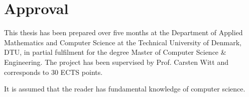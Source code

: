 \section*{Approval}
This thesis has been prepared over five months at the Department of Applied Mathematics and Computer Science at the Technical University of Denmark, DTU, in partial fulfilment for
the degree Master of Computer Science \& Engineering. The project has been supervised by Prof. Carsten Witt and corresponds to 30 ECTS points.

It is assumed that the reader has fundamental knowledge of computer science.

\vfill

\begin{center}
\namesigdate{\thesisauthor~-~\studentnumber}
\end{center}

\vfill

